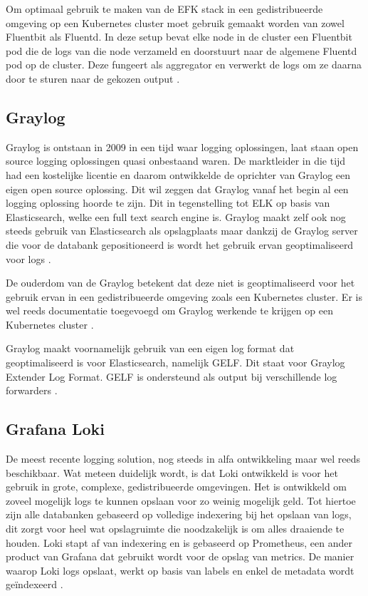 Om optimaal gebruik te maken van de EFK stack in een gedistribueerde omgeving op een Kubernetes cluster moet gebruik gemaakt worden van zowel Fluentbit als Fluentd. In deze setup bevat elke node in de cluster een Fluentbit pod die de logs van die node verzameld en doorstuurt naar de algemene Fluentd pod op de cluster. Deze fungeert als aggregator en verwerkt de logs om ze daarna door te sturen naar de gekozen output \autocite{berman2018-06}.

\subsection{Graylog}
\label{subsec:graylog}
Graylog is ontstaan in 2009 in een tijd waar logging oplossingen, laat staan open source logging oplossingen quasi onbestaand waren. De marktleider in die tijd had een kostelijke licentie en daarom ontwikkelde de oprichter van Graylog een eigen open source oplossing. Dit wil zeggen dat Graylog vanaf het begin al een logging oplossing hoorde te zijn. Dit in tegenstelling tot ELK op basis van Elasticsearch, welke een full text search engine is. Graylog maakt zelf ook nog steeds gebruik van Elasticsearch als opslagplaats maar dankzij de Graylog server die voor de databank gepositioneerd is wordt het gebruik ervan geoptimaliseerd voor logs \autocite{graylog}.

De ouderdom van de Graylog betekent dat deze niet is geoptimaliseerd voor het gebruik ervan in een gedistribueerde omgeving zoals een Kubernetes cluster. Er is wel reeds documentatie toegevoegd om Graylog werkende te krijgen op een Kubernetes cluster \autocite{lumiq2017}.  

Graylog maakt voornamelijk gebruik van een eigen log format dat geoptimaliseerd is voor Elasticsearch, namelijk GELF. Dit staat voor Graylog Extender Log Format. GELF is ondersteund als output bij verschillende log forwarders \autocite{graylog}. 

\subsection{Grafana Loki}
De meest recente logging solution, nog steeds in alfa ontwikkeling maar wel reeds beschikbaar. Wat meteen duidelijk wordt, is dat Loki ontwikkeld is voor het gebruik in grote, complexe, gedistribueerde omgevingen. Het is ontwikkeld om zoveel mogelijk logs te kunnen opslaan voor zo weinig mogelijk geld. Tot hiertoe zijn alle databanken gebaseerd op volledige indexering bij het opslaan van logs, dit zorgt voor heel wat opslagruimte die noodzakelijk is om alles draaiende te houden. Loki stapt af van indexering en is gebaseerd op Prometheus, een ander product van Grafana dat gebruikt wordt voor de opslag van metrics. De manier waarop Loki logs opslaat, werkt op basis van labels en enkel de metadata wordt geïndexeerd \autocite{oleksii2019}.

